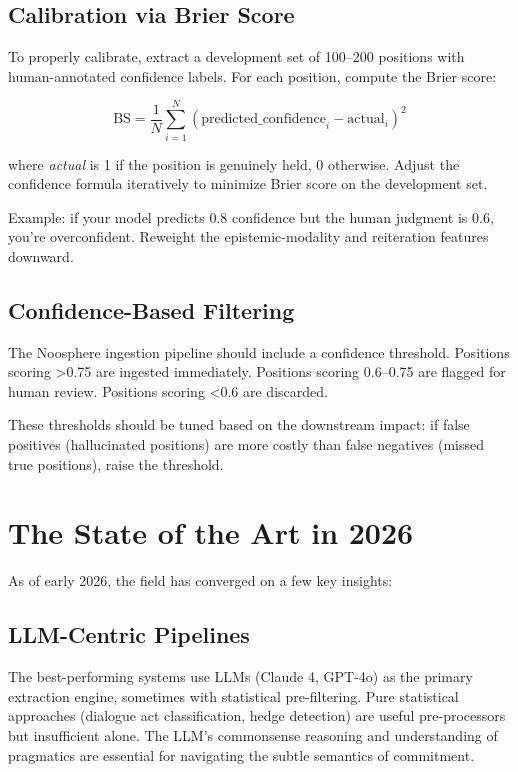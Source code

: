 \documentclass[11pt,letterpaper]{article}
\begin{document}
\subsection{Calibration via Brier Score}

To properly calibrate, extract a development set of 100–200 positions with human-annotated confidence labels. For each position, compute the Brier score:

\[
\text{BS} = \frac{1}{N} \sum_{i=1}^{N} (\text{predicted\_confidence}_i - \text{actual}_i)^2
\]

where \textit{actual} is 1 if the position is genuinely held, 0 otherwise. Adjust the confidence formula iteratively to minimize Brier score on the development set.

Example: if your model predicts 0.8 confidence but the human judgment is 0.6, you're overconfident. Reweight the epistemic-modality and reiteration features downward.

\subsection{Confidence-Based Filtering}

The Noosphere ingestion pipeline should include a confidence threshold. Positions scoring \textgreater0.75 are ingested immediately. Positions scoring 0.6–0.75 are flagged for human review. Positions scoring \textless0.6 are discarded.

These thresholds should be tuned based on the downstream impact: if false positives (hallucinated positions) are more costly than false negatives (missed true positions), raise the threshold.

\section{The State of the Art in 2026}

As of early 2026, the field has converged on a few key insights:

\subsection{LLM-Centric Pipelines}

The best-performing systems use LLMs (Claude 4, GPT-4o) as the primary extraction engine, sometimes with statistical pre-filtering. Pure statistical approaches (dialogue act classification, hedge detection) are useful pre-processors but insufficient alone. The LLM's commonsense reasoning and understanding of pragmatics are essential for navigating the subtle semantics of commitment.
\end{document}
